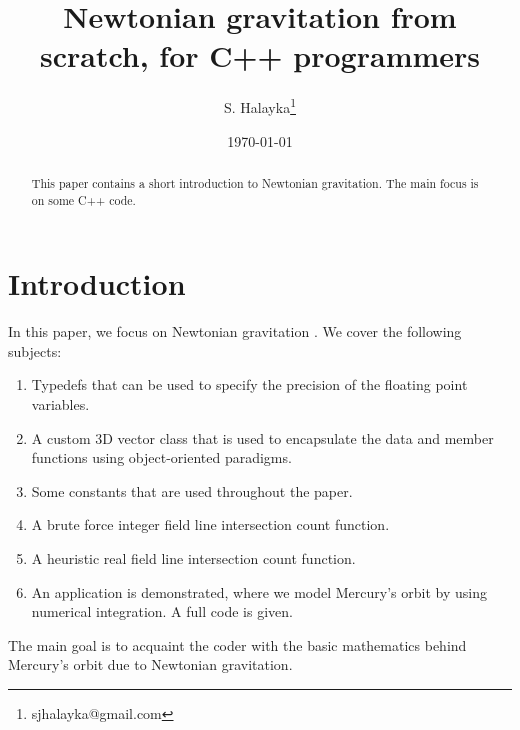 \documentclass[12pt]{article}
\title{Newtonian gravitation from scratch, for C++ programmers}
\author{S. Halayka\footnote{sjhalayka@gmail.com}}
\date{\today\;\currenttime}
\begin{document}
 
\maketitle

\begin{abstract}
This paper contains a short introduction to Newtonian gravitation.
The main focus is on some C++ code.
\end{abstract}




\section{Introduction}

In this paper, we focus on Newtonian gravitation \cite{misner}.
We cover the following subjects:
\begin{enumerate}
\item Typedefs that can be used to specify the precision of the floating point variables.
\item A custom 3D vector class that is used to encapsulate the data and member functions using object-oriented paradigms.
\item Some constants that are used throughout the paper.
\item A brute force integer field line intersection count function.
\item A heuristic real field line intersection count function.
\item An application is demonstrated, where we model Mercury's orbit by using numerical integration.
A full code is given.
\end{enumerate}

The main goal is to acquaint the coder with the basic mathematics behind Mercury's orbit due to Newtonian gravitation.
\end{document}
